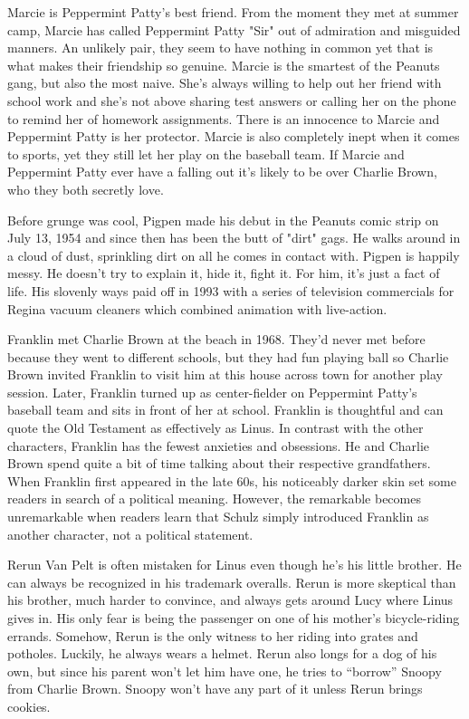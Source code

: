 Marcie is Peppermint Patty's best friend. From the moment they met at summer camp, Marcie has called Peppermint Patty "Sir" out of admiration and misguided manners. An unlikely pair, they seem to have nothing in common yet that is what makes their friendship so genuine. Marcie is the smartest of the Peanuts gang, but also the most naive. She's always willing to help out her friend with school work and she's not above sharing test answers or calling her on the phone to remind her of homework assignments. There is an innocence to Marcie and Peppermint Patty is her protector. Marcie is also completely inept when it comes to sports, yet they still let her play on the baseball team. If Marcie and Peppermint Patty ever have a falling out it's likely to be over Charlie Brown, who they both secretly love.


Before grunge was cool, Pigpen made his debut in the Peanuts comic strip on July 13, 1954 and since then has been the butt of "dirt" gags. He walks around in a cloud of dust, sprinkling dirt on all he comes in contact with. Pigpen is happily messy. He doesn't try to explain it, hide it, fight it. For him, it's just a fact of life. His slovenly ways paid off in 1993 with a series of television commercials for Regina vacuum cleaners which combined animation with live-action.


Franklin met Charlie Brown at the beach in 1968. They'd never met before because they went to different schools, but they had fun playing ball so Charlie Brown invited Franklin to visit him at this house across town for another play session. Later, Franklin turned up as center-fielder on Peppermint Patty's baseball team and sits in front of her at school. Franklin is thoughtful and can quote the Old Testament as effectively as Linus. In contrast with the other characters, Franklin has the fewest anxieties and obsessions. He and Charlie Brown spend quite a bit of time talking about their respective grandfathers. When Franklin first appeared in the late 60s, his noticeably darker skin set some readers in search of a political meaning. However, the remarkable becomes unremarkable when readers learn that Schulz simply introduced Franklin as another character, not a political statement.


Rerun Van Pelt is often mistaken for Linus even though he's his little brother. He can always be recognized in his trademark overalls. Rerun is more skeptical than his brother, much harder to convince, and always gets around Lucy where Linus gives in. His only fear is being the passenger on one of his mother's bicycle-riding errands. Somehow, Rerun is the only witness to her riding into grates and potholes. Luckily, he always wears a helmet. Rerun also longs for a dog of his own, but since his parent won't let him have one, he tries to ``borrow'' Snoopy from Charlie Brown. Snoopy won't have any part of it unless Rerun brings cookies.



